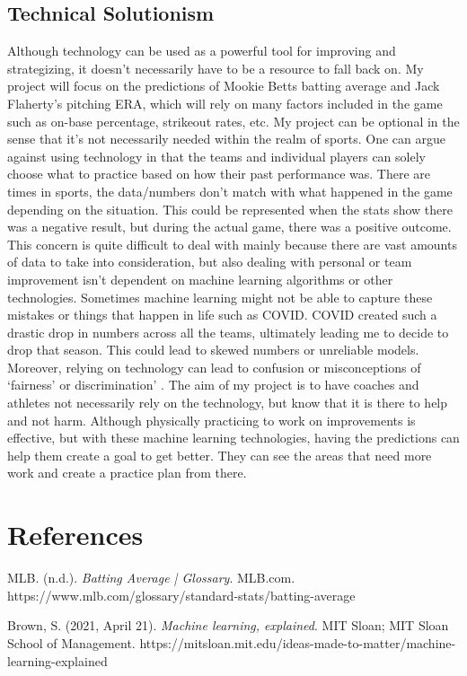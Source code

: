 \documentclass[10pt,twocolumn]{article}
\begin{document}
\subsection{ Technical Solutionism}
Although technology can be used as a powerful tool for improving and strategizing, it doesn’t necessarily have to be a resource to fall back on. My project will focus on the predictions of Mookie Betts batting average and Jack Flaherty’s pitching ERA, which will rely on many factors included in the game such as on-base percentage, strikeout rates, etc. My project can be optional in the sense that it’s not necessarily needed within the realm of sports. One can argue against using technology in that the teams and individual players can solely choose what to practice based on how their past performance was. There are times in sports, the data/numbers don’t match with what happened in the game depending on the situation. This could be represented when the stats show there was a negative result, but during the actual game, there was a positive outcome. This concern is quite difficult to deal with mainly because there are vast amounts of data to take into consideration, but also dealing with personal or team improvement isn’t dependent on machine learning algorithms or other technologies. Sometimes machine learning might not be able to capture these mistakes or things that happen in life such as COVID. COVID created such a drastic drop in numbers across all the teams, ultimately leading me to decide to drop that season. This could lead to skewed numbers or unreliable models. Moreover, relying on technology can lead to confusion or misconceptions of ‘fairness’ or discrimination’ \cite{23}. The aim of my project is to have coaches and athletes not necessarily rely on the technology, but know that it is there to help and not harm. Although physically practicing to work on improvements is effective, but with these machine learning technologies, having the predictions can help them create a goal to get better. They can see the areas that need more work and create a practice plan from there.

\section{References}
\cite{1} MLB. (n.d.). \textit{Batting Average | Glossary}. MLB.com. https://www.mlb.com/glossary/standard-stats/batting-average

\cite{2} Brown, S. (2021, April 21). \textit{Machine learning, explained}. MIT Sloan; MIT Sloan School of Management. https://mitsloan.mit.edu/ideas-made-to-matter/machine-learning-explained
\end{document}
